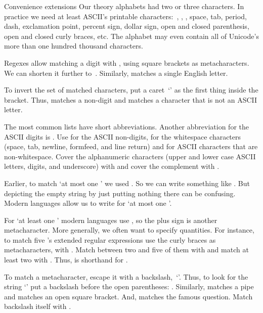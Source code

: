 \documentclass[9pt,t,serif,professionalfont,xcolor={table,dvipsnames},noamsthm]{beamer}
\begin{document}
\begin{frame}{Convenience extensions}
Our theory alphabets had two or three characters.
In practice we need at least ASCII's
printable characters:~\dash {}, \dash {},
\dash {},
space, tab, period, dash, exclamation point, percent sign, dollar sign, 
open and closed parenthesis, open and closed curly braces, etc.\sentencespace
The alphabet may even contain all of Unicode's
more than one hundred thousand characters. 

Regexes allow matching a digit with \re{[0123456789]},
using square brackets as metacharacters.
We can shorten it further to~\re{[0-9]}.
Similarly,
\re{[A-Za-z]} matches a single English letter.

To invert the set of matched characters, put a
caret~`\re{\textasciicircum}' as
the first thing inside the bracket.
Thus, \re{[\textasciicircum 0-9]} matches a non-digit
and \re{[\textasciicircum A-Za-z]} matches a character that is not
an ASCII letter.

The most common lists have short abbreviations.
Another abbreviation for the ASCII digits is
.
Use
 for the ASCII non-digits,
 for the whitespace characters
(space, tab, newline, formfeed, and line return)
and  for ASCII characters that are non-whitespace.
Cover
the alphanumeric characters (upper and lower case ASCII letters, digits,
and underscore) with  
and cover the complement with .
\end{frame}



\begin{frame}
Earlier,
to match  `at most one ' we used .
So we can write something like .
But depicting the empty string by just putting nothing there can be confusing.
Modern languages allow us to write
 for `at most one '.

For `at least one '
modern languages use , so the plus sign is another
metacharacter.
More generally, we often want to specify quantities.
For instance, to match five 's extended regular expressions use
the curly braces as metacharacters, with .
Match between two and five of them with 
and match at least two with .
Thus,  is shorthand for .

\pause
To match a metacharacter, \alert{escape} it with a backslash,~`\str{\textbackslash}'.
Thus, to look for the string `' put a backslash
before the open parentheses:
.
Similarly, \re{\textbackslash |} matches a pipe and \re{\textbackslash [}
matches an open square bracket.
And,  matches
the famous question. 
Match backslash itself with \re{\textbackslash\textbackslash}.
\end{frame}
\end{document}
